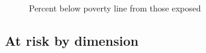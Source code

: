 \documentclass[
  letterpaper,
  DIV=11,
  numbers=noendperiod]{scrartcl}
\begin{document}
\begin{figure}[H]


\caption{\label{fig-exposed-and-poor}Percent below poverty line from
those exposed}

\end{figure}%

\subsection{At risk by dimension}\label{at-risk-by-dimension}
\end{document}
